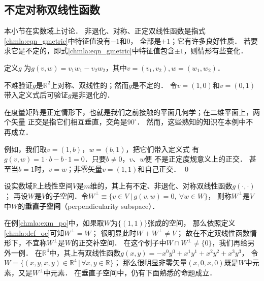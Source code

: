 \subsection{不定对称双线性函数}\label{chmla:sec_indefbif}
本小节在实数域上讨论．
非退化、对称、{\heiti 正定}双线性函数是指式\eqref{chmla:eqn_gmetric}中特征值没有$-1$和$0$，
全部是$+1$；它有许多良好性质．
若要求它是{\heiti 不定的}，即式\eqref{chmla:eqn_gmetric}中特征值包含$\pm 1$，则情形有些变化．

\begin{example}\label{chmla:exm_po}
    定义$g$ %
    为$g(v,w)=v_1 w_1 -v_2 w_2$，其中$v=(v_1,v_2), w=(w_1,w_2)$．
\end{example}

不难验证$g$是$\mathbb{R}^2$上对称、双线性的；然而$g$是不定的．
令$v=(1,0)$和$v=(0,1)$带入定义式后可验证$g$是非退化的．

在度量矩阵是正定情形下，也就是我们之前接触的平面几何学；在二维平面上，两个矢量
正交是指它们相互垂直，交角是$90^\circ$．
然而，这些熟知的知识在本例中不再成立．

例如，我们取$v=(1,b)$，$w=(b,1)$，把它们带入定义式
有$g(v,w)=1\cdot b- b\cdot 1 =0$．只要$b\neq 0$，$v$、$w$便
不是正定度规意义上的正交．
甚至当$b=1$时，$v=w$；非零矢量$v=(1,1)$和自己正交．
\qed

\begin{definition}\label{chmla:def_oc}
    设实数域$\mathbb{R}$上线性空间$V$是$m$维的，其上有不定、非退化、对称双线性函数$g(\cdot,\cdot)$；
    再设$W$是$V$的子空间．令$W^\perp \equiv \{v\in V \ |\ g(v,w)=0,\ \forall w\in W \}$，
    则称$W^\perp$是$V$中$W$的{\heiti \bfseries 垂直子空间}（perpendicularity subspace）．
\end{definition}


在例\ref{chmla:exm_po}中，如果取$W$为$\{(1,1)\}$张成的空间，
那么依照定义\eqref{chmla:def_oc}可知$W^\perp=W$；
很明显此时$W+W^\perp \neq V$；
故在不定双线性函数情形下，不宜称$W^\perp$是$W$的{\kaishu 正交补空间}．
在这个例子中$W\cap W^\perp \neq \{0\}$，我们再给另外一例．
在$\mathbb{R}^4$中，其上有双线性函数$g(x,y)=-x^0 y^0+x^1 y^1+x^2 y^2+x^3 y^3$，
令$W=\{(x,y,x,y)\in \mathbb{R}^4 \, |\, \forall x,y\in \mathbb{R}\}$；
那么很明显非零矢量$(x,0,x,0)$既是$W$中元素，又是$W^\perp$中元素．
在{\kaishu 垂直子空间}中，仍有下面熟悉的命题成立．

